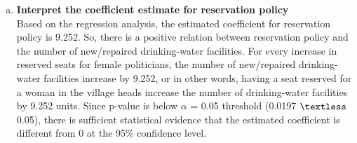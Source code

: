 \documentclass[12pt,letterpaper]{article}
\begin{document}
\begin{enumerate} [(a)]
\begin{verbatim}
			Call:
			lm(formula = water ~ reserved, data = female_policy_data)
			
			Residuals:
			Min      1Q  Median      3Q     Max 
			-23.991 -14.738  -7.865   2.262 316.009 
			
			Coefficients:
			Estimate Std. Error t value Pr(>|t|)    
			(Intercept)   14.738      2.286   6.446 4.22e-10 ***
			reserved       9.252      3.948   2.344   0.0197 *  
			---
			Signif. codes:  0 ‘***’ 0.001 ‘**’ 0.01 ‘*’ 0.05 ‘.’ 0.1 ‘ ’ 1
			
			Residual standard error: 33.45 on 320 degrees of freedom
			Multiple R-squared:  0.01688,	Adjusted R-squared:  0.0138 
			F-statistic: 5.493 on 1 and 320 DF,  p-value: 0.0197
		\end{verbatim}
	
	\item \textbf{Interpret the coefficient estimate for reservation policy} \\
	Based on the regression analysis, the estimated coefficient for reservation policy is 9.252. So, there is a positive relation between reservation policy and the number of new/repaired drinking-water facilities. For every increase in reserved seats for female politicians, the number of new/repaired drinking-water facilities increase by 9.252, or in other words, having a seat reserved for a woman in the village heads increase the number of drinking-water facilities by 9.252 units.
	Since p-value is below $\alpha$ = 0.05 threshold (0.0197 $\textless$ 0.05), there is sufficient statistical evidence that the estimated coefficient is different from 0 at the 95\% confidence level.
	\end{enumerate}
\end{document}
